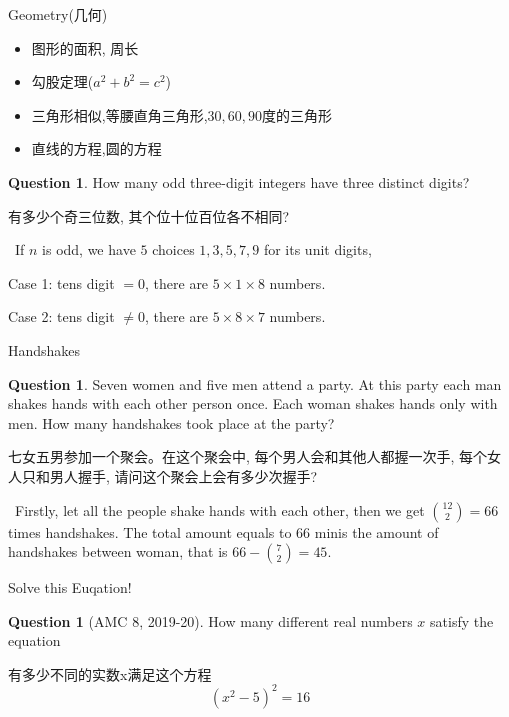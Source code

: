 \documentclass{beamer}
\theoremstyle{definition}
\newtheorem{ques}[defn]{Question}
\newenvironment{prooff}{{\noindent\it\textcolor{cyan!40!black}{Proof}:}\,}{\par}
\begin{document}
\begin{frame}{Geometry(几何)}
    \begin{itemize}
    \item 图形的面积, 周长
    \item 勾股定理($a^2+b^2=c^2$)
    \item 三角形相似,等腰直角三角形,$30,60,90$度的三角形
    \item 直线的方程,圆的方程
\end{itemize}
\end{frame}
\begin{frame}
    \begin{ques}
        How many odd three-digit integers have three distinct digits?

        有多少个奇三位数, 其个位十位百位各不相同?
        \pause
    \end{ques}
    \begin{prooff}
        If $n$ is odd, we have $5$ choices $1,3,5,7,9$ for its unit digits,

        Case 1: tens digit $=0$, there are $5\times 1\times 8$ numbers.

        Case 2: tens digit $\neq 0$, there are $5\times 8 \times 7$ numbers.
    \end{prooff}
\end{frame}
\begin{frame}{Handshakes}
    \begin{ques}
        Seven women and five men attend a party. At this party each man shakes hands with each other person once. Each woman shakes hands only with men.
        How many handshakes took place at the party?

        七女五男参加一个聚会。在这个聚会中, 每个男人会和其他人都握一次手, 每个女人只和男人握手, 请问这个聚会上会有多少次握手?
    \end{ques}
    \pause
    \begin{prooff}
        Firstly, let all the people shake hands with each other, then we get $\binom{12}{2}=66$ times handshakes.
        The total amount equals to $66$ minis the amount of handshakes between woman, that is $66-\binom{7}{2}=45$.
    \end{prooff}
\end{frame}
\begin{frame}{Solve this Euqation!}
    \begin{ques}[AMC 8, 2019-20]
        How many different real numbers $x$ satisfy the equation

        有多少不同的实数x满足这个方程
        \begin{equation*}
            (x^2-5)^2=16
        \end{equation*}
    \end{ques}
\end{frame}
\end{document}

